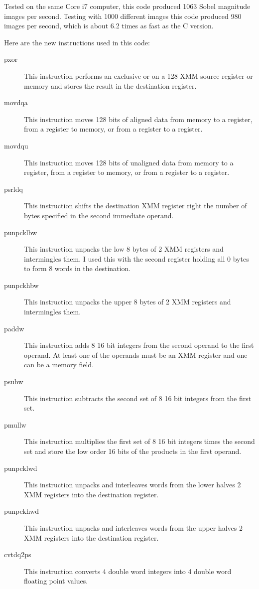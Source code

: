 \documentclass[11pt,b5paper]{book}
\begin{document}
Tested on the same Core i7 computer, this code produced 1063 Sobel magnitude
images per second.
Testing with 1000 different images this code produced 980 images per second, which is about 6.2 times as fast as the C version.

Here are the new instructions used in this code:

\begin{description}
    \item [pxor] This instruction performs an exclusive or on a 128 XMM
          source register or memory and stores the result in the destination register.
    \item [movdqa] This instruction moves 128 bits of aligned data from memory
                   to a register, from a register to memory, or from a register
                   to a register.
    \item [movdqu] This instruction moves 128 bits of unaligned data from memory
                   to a register, from a register to memory, or from a register
                   to a register.
    \item [psrldq] This instruction shifts the destination XMM register right the
                   number of bytes specified in the second immediate operand.
    \item [punpcklbw] This instruction unpacks the low 8 bytes of 2 XMM registers
                   and intermingles them. I used this with the second register
                   holding all 0 bytes to form 8 words in the destination.
    \item [punpckhbw] This instruction unpacks the upper 8 bytes of 2 XMM
                   registers and intermingles them.
    \item [paddw]  This instruction adds 8 16 bit integers from the second
                   operand to the first operand.  At least one of the operands
                   must be an XMM register and one can be a memory field.
    \item [psubw]  This instruction subtracts the second set of 8 16 bit integers
                   from the first set.
    \item [pmullw] This instruction multiplies the first set of 8 16 bit integers
                   times the second set and store the low order 16 bits of the
                   products in the first operand.
    \item [punpcklwd]   This instruction unpacks and interleaves words from
                   the lower halves 2 XMM registers into the destination register.
    \item [punpckhwd]   This instruction unpacks and interleaves words from
                   the upper halves 2 XMM registers into the destination register.
    \item [cvtdq2ps]  This instruction converts 4 double word integers into
                   4 double word floating point values.
    
\end{description}
\end{document}
